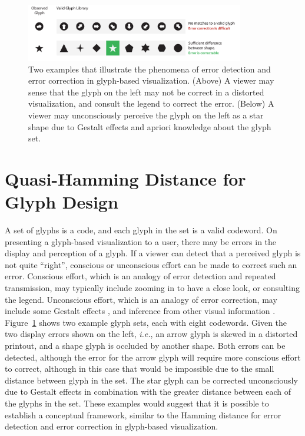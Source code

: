 \begin{figure}[t]
\begin{center}
\includegraphics[width=0.85\textwidth]{images/filesystem/latest/QHD}
\end{center}
\caption{Two examples that illustrate the phenomena of error detection and error correction in glyph-based visualization. (Above) A viewer may sense that the glyph on the left may not be correct in a distorted visualization, and consult the legend to correct the error. (Below) A viewer may unconsciously perceive the glyph on the left as a star shape due to Gestalt effects and apriori knowledge about the glyph set.}
\label{fig:glyph_hamming}
\end{figure}

\section{Quasi-Hamming Distance for Glyph Design}
\label{sec:qhd}
%
A set of glyphs is a code, and each glyph in the set is a valid codeword.
On presenting a glyph-based visualization to a user, there may be errors in the display and perception of a glyph.
If a viewer can detect that a perceived glyph is not quite ``right'', conscious or unconscious effort can be made to correct such an error.
Conscious effort, which is an analogy of error detection and repeated transmission, may typically include zooming in to have a close look, or consulting the legend.
Unconscious effort, which is an analogy of error correction, may include some Gestalt effects \cite{Chen:2014:CGF}, and inference from other visual information \cite{Rheingans:1995:PIV}.
Figure~\ref{fig:glyph_hamming} shows two example glyph sets, each with eight codewords.
Given the two display errors shown on the left, \emph{i.e.}, an arrow glyph is skewed in a distorted printout, and a shape glyph is occluded by another shape.
Both errors can be detected, although the error for the arrow glyph will require more conscious effort to correct, although in this case that would be impossible due to the small distance between glyph in the set. 
The star glyph can be corrected unconsciously due to Gestalt effects in combination with the greater distance between each of the glyphs in the set.
These examples would suggest that it is possible to establish a conceptual framework, similar to the Hamming distance for error detection and error correction in glyph-based visualization.

